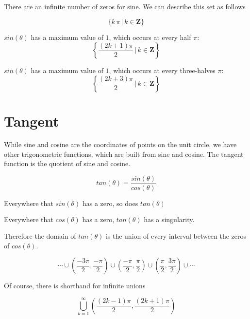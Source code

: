 \documentclass{ximera}
\begin{document}
There are an infinite number of zeros for sine.  We can describe this set as follows


\[  \{  k \, \pi   \, | \, k \in \textbf{Z}   \}      \]





$sin(\theta)$ has a maximum value of $1$, which occurs at every half $\pi$:  
\[ \left\{  \frac{(2k+1)\pi}{2} \, | \, k \in \textbf{Z}\right\} \]



$sin(\theta)$ has a maximum value of $1$, which occurs at every three-halves $\pi$:  
\[ \left\{  \frac{(2k+3)\pi}{2} \, | \, k \in \textbf{Z}\right\} \]











\section{Tangent}


While sine and cosine are the coordinates of points on the unit circle, we have other trigonometric functions, which are built from sine and cosine.  The tangent function is the quotient of sine and cosine.




\[ tan(\theta) = \frac{sin(\theta)}{cos(\theta)} \]


Everywhere that $sin(\theta)$ has a zero, so does $tan(\theta)$

Everywhere that $cos(\theta)$ has a zero, $tan(\theta)$ has a singularity.


Therefore the domain of $tan(\theta)$ is the union of every interval between the zeros of $cos(\theta)$.


\[      \cdots   \cup  \left(\frac{-3\pi}{2}, \frac{-\pi}{2}\right) \cup \left(\frac{-\pi}{2}, \frac{\pi}{2}\right) \cup \left(\frac{\pi}{2} , \frac{3\pi}{2}\right) \cup \cdots              \]


Of course, there is shorthand for infinite unions







\[    \bigcup^\infty_{k=1} \left(\frac{(2k-1)\pi}{2}, \frac{(2k+1)\pi}{2}\right)   \]
\end{document}
